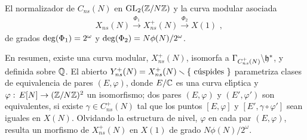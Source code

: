 \begin{subsection}{El normalizador de $C_{ns}(N)$ en $\GL{2}(\bb{Z}/N\bb{Z})$ %
		y la curva modular asociada}
\begin{align*}
 & X_{ns}(N)\xrightarrow{\Phi_{1}}
 X_{ns}^{+}(N)\xrightarrow{\Phi_{2}} X(1)\text{ ,}
\end{align*}
de grados $\rm{deg}(\Phi_{1})=2^{\omega}$ y
$\rm{deg}(\Phi_{2})=N\phi(N)/2^{\omega}$.

En resumen, existe una curva modular, $X_{ns}^{+}(N)$, isomorfa a
$\Gamma_{C_{ns}^{+}(N)}\backs\frak{h}^{*}$, y definida sobre $\bb{Q}$.
El abierto
$Y_{ns}^{+}(N)=X_{ns}^{+}(N)\setmin\{\text{ c\'{u}spides }\}$
parametriza clases de equivalencia de pares $(E,\varphi)$, donde
$E/\bb{C}$ es una curva el\'{\i}ptica y
$\varphi:\,E[N]\rightarrow(\bb{Z}/N\bb{Z})^{2}$ un isomorfismo; dos pares
$(E,\varphi)$ y $(E',\varphi')$ son equivalentes, si existe
$\gamma\in C_{ns}^{+}(N)$ tal que los puntos $[E,\varphi]$ y
$[E',\gamma\circ\varphi']$ sean iguales en $X(N)$. Olvidando la estructura de
nivel, $\varphi$ en cada par $(E,\varphi)$, resulta un morfismo de $X_{ns}^{+}(N)$
en $X(1)$ de grado $N\phi(N)/2^{\omega}$.
%

\end{subsection}

